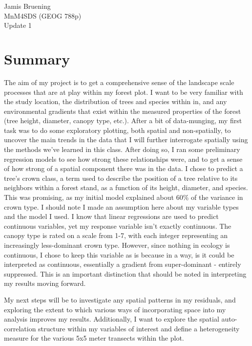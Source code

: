 \documentclass[11pt,a4paper]{article}
\begin{document}
\noindent Jamis Bruening \\
MnM4SDS (GEOG 788p) \\
Update 1

\onehalfspace

\section{Summary}

The aim of my project is to get a comprehensive sense of the landscape scale processes that are at play within my forest plot.  I want to be very familiar with the study location, the distribution of trees and species within in, and any environmental gradients that exist within the measured properties of the forest (tree height, diameter, canopy type, etc.).  After a bit of data-munging, my first task was to do some exploratory plotting, both spatial and non-spatially, to uncover the main trends in the data that I will further interrogate spatially using the methods we've learned in this class.  After doing so, I ran some preliminary regression models to see how strong these relationships were, and to get a sense of how strong of a spatial component there was in the data.  I chose to predict a tree's crown class, a term used to describe the position of a tree relative to its neighbors within a forest stand, as a function of its height, diameter, and species.  This was promising, as my initial model explained about 60\% of the variance in crown type. I should note I made an assumption here about my variable types and the model I used.  I know that linear regressions are used to predict continuous variables, yet my response variable isn't exactly continuous.  The canopy type is rated on a scale from 1-7, with each integer representing an increasingly less-dominant crown type.  However, since nothing in ecology is continuous, I chose to keep this variable as is because in a way, is it could be interpreted as continuous, essentially a gradient from super-dominant - entirely suppressed.  This is an important distinction that should be noted in interpreting my results moving forward.

My next steps will be to investigate any spatial patterns in my residuals, and exploring the extent to which various ways of incorporating space into my analysis improves my results.  Additionally, I want to explore the spatial auto-correlation structure within my variables of interest and define a heterogeneity measure for the various 5x5 meter transects within the plot.
\end{document}
